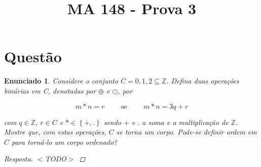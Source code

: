 \documentclass[a4paper,twoside,11pt]{article}
\newtheorem*{enunciado}{Enunciado}
\begin{document}
\title{MA 148 - Prova 3}
\author{}
\date{}
\maketitle



\section{Questão}
\begin{enunciado}
    Considere o conjunto $C = {0, 1, 2} \subseteq \mathbb{Z}$.
    Defina duas operações binárias em C, denotadas por $\oplus$ e $\odot$, por

    $$m \ast n = r \qquad \text{ se } \qquad m \ast n = 3q + r$$

    com $q \in \mathbb{Z}$, $r \in C$ e $\ast \in \left\{ +, . \right\}$ sendo
    $+$ e $.$ a soma e a multiplicação de $\mathbb{Z}$. Mostre que, com estas
    operações, $C$ se torna um corpo. Pode-se definir ordem em $C$ para
    torná-lo um corpo ordenado?

    \begin{proof}[Resposta]
        $<$TODO$>$
    \end{proof}
\end{enunciado}
\end{document}
